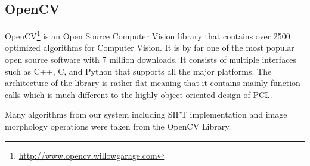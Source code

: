 \subsection{OpenCV}
OpenCV\footnote{\url{http://www.opencv.willowgarage.com}} is an Open Source Computer Vision library that contains over 2500 optimized algorithms for Computer Vision. It is by far one of the most popular open source software with 7 million downloads. It consists of multiple interfaces such as C++, C, and Python that supports all the major platforms. The architecture of the library is rather flat meaning that it contains mainly function calls which is much different to the highly object oriented design of PCL.

Many algorithms from our system including SIFT implementation and image morphology operations were taken from the OpenCV Library. 








